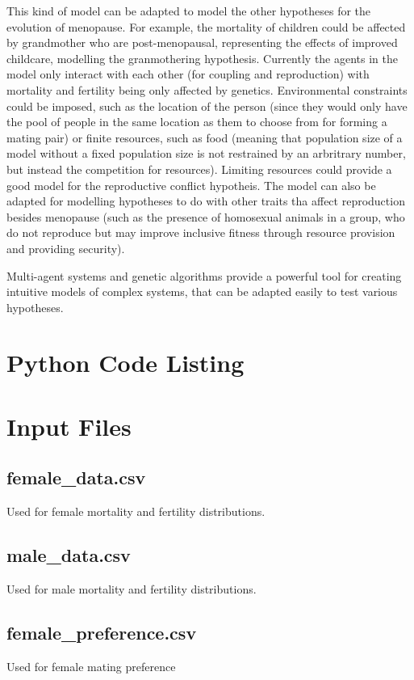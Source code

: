 \documentclass[authoryearcitations]{UoYCSproject}
\begin{document}
This kind of model can be adapted to model the other hypotheses for the evolution of menopause. For example, the mortality of children could be affected by grandmother who are post-menopausal, representing the effects of improved childcare, modelling the granmothering hypothesis. Currently the agents in the model only interact with each other (for coupling and reproduction) with mortality and fertility being only affected by genetics. Environmental constraints could be imposed, such as the location of the person (since they would only have the pool of people in the same location as them to choose from for forming a mating pair) or finite resources, such as food (meaning that population size of a model without a fixed population size is not restrained by an arbritrary number, but instead the competition for resources). Limiting resources could provide a good model for the reproductive conflict hypotheis. The model can also be adapted for modelling hypotheses to do with other traits tha affect reproduction besides menopause (such as the presence of homosexual animals in a group, who do not reproduce but may improve inclusive fitness through resource provision and providing security). 

Multi-agent systems and genetic algorithms provide a powerful tool for creating intuitive models of complex systems, that can be adapted easily to test various hypotheses.



 

\appendix
\chapter{Python Code Listing}

\chapter{Input Files}
\section{female\_data.csv}
Used for female mortality and fertility distributions.

\section{male\_data.csv}
Used for male mortality and fertility distributions.

\section{female\_preference.csv}
Used for female mating preference
\end{document}
